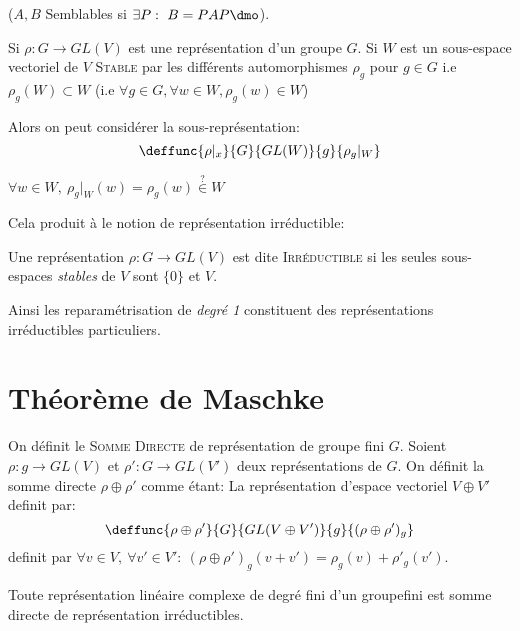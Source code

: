 ($A,B$ Semblables si $\exists P:\ B=PAP\dmo$).

Si $\rho:G\rightarrow GL(V)$ est une représentation d'un groupe $G$. Si $W$ est un sous-espace vectoriel de $V$ \textsc{Stable} par les différents automorphismes $\rho_g$ pour $g\in G$ i.e $\rho_g(W)\subset W$ (i.e $\forall g\in G, \forall w\in W, \rho_g(w)\in W$)

Alors on peut considérer la sous-représentation:
$$\deffunc{\rho|_x}{G}{GL(W)}{g}{\rho_g|_W}$$

\begin{remark}
	$\forall w\in W,\ \rho_g|_W(w)=\rho_g(w)\overset{?}{\in}W$
\end{remark}
Cela produit à le notion de représentation irréductible:
\begin{definition}
	Une représentation $\rho: G\rightarrow  GL(V)$ est dite \textsc{Irréductible} si les seules sous-espaces \emph{stables} de $V$ sont $\{0\}$ et $V$.
\end{definition}

Ainsi les reparamétrisation de \emph{degré 1} constituent des représentations irréductibles particuliers.

\section{Théorème de Maschke}
\begin{definition}
	On définit le \textsc{Somme Directe} de représentation de groupe fini $G$. Soient $\rho:g\rightarrow GL(V)$ et $\rho': G\rightarrow GL(V')$ deux représentations de $G$. On définit la somme directe $\rho\oplus \rho'$ comme étant:
	La représentation d'espace vectoriel $V\oplus V'$ definit par:
	$$\deffunc{\rho\oplus\rho'}{G}{GL(V\oplus V')}{g}{(\rho\oplus\rho')_g}$$ definit par $\forall v\in V,\ \forall v'\in V':\  (\rho\oplus \rho')_g(v+v')=\rho_g(v)+\rho'_g(v')$.
\end{definition}

\begin{theorem}	
	Toute représentation linéaire complexe de degré fini d'un groupefini est somme directe de représentation irréductibles.
\end{theorem}

